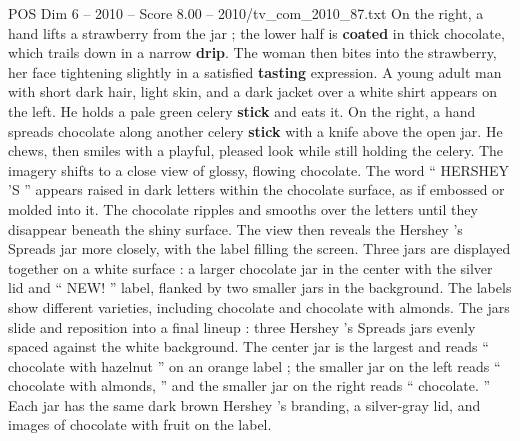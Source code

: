 \begin{textsample}{POS Dim 6 – 2010 – Score 8.00 – 2010/tv\_com\_2010\_87.txt}
On the right, a hand lifts a strawberry from the jar ; the lower half is \textbf{coated} in thick chocolate, which trails down in a narrow \textbf{drip}.
The woman then bites into the strawberry, her face tightening slightly in a satisfied \textbf{tasting} expression.
A young adult man with short dark hair, light skin, and a dark jacket over a white shirt appears on the left.
He holds a pale green celery \textbf{stick} and eats it.
On the right, a hand spreads chocolate along another celery \textbf{stick} with a knife above the open jar.
He chews, then smiles with a playful, pleased look while still holding the celery.
The imagery shifts to a close view of glossy, flowing chocolate.
The word “ HERSHEY ’S ” appears raised in dark letters within the chocolate surface, as if embossed or molded into it.
The chocolate ripples and smooths over the letters until they disappear beneath the shiny surface.
The view then reveals the Hershey ’s Spreads jar more closely, with the label filling the screen.
Three jars are displayed together on a white surface : a larger chocolate jar in the center with the silver lid and “ NEW! ” label, flanked by two smaller jars in the background.
The labels show different varieties, including chocolate and chocolate with almonds.
The jars slide and reposition into a final lineup : three Hershey ’s Spreads jars evenly spaced against the white background.
The center jar is the largest and reads “ chocolate with hazelnut ” on an orange label ; the smaller jar on the left reads “ chocolate with almonds, ” and the smaller jar on the right reads “ chocolate. ” Each jar has the same dark brown Hershey ’s branding, a silver-gray lid, and images of chocolate with fruit on the label.

\end{textsample}
